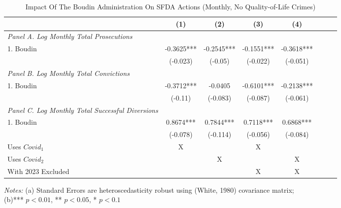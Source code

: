 \begin{table}[htbp]
  \centering
  \caption{Impact Of The Boudin Administration On SFDA Actions (Monthly, No Quality-of-Life Crimes)}
  \label{tab:regression_ca_noqol}
  \begin{tabular}{lccccccc}
    \toprule
    & \multirow{1}{*}{(1)} & \multirow{1}{*}{(2)} & \multirow{1}{*}{(3)} & \multirow{1}{*}{(4)} \\
    \midrule
    \textit{Panel A. Log Monthly Total Prosecutions}  &   &   &  &  \\
    1. Boudin  & -0.3625*** & -0.2545*** & -0.1551*** & -0.3618*** \\
     & (-0.023) & (-0.05) & (-0.022) & (-0.051) \\ \addlinespace

    \textit{Panel B. Log Monthly Total Convictions}  &   &   &  &  \\
    1. Boudin  & -0.3712*** & -0.0405 & -0.6101*** & -0.2138*** \\
     & (-0.11) & (-0.083) & (-0.087) & (-0.061) \\ \addlinespace

    \textit{Panel C. Log Monthly Total Successful Diversions}  &   &   &  &  \\
    1. Boudin  & 0.8674*** & 0.7844*** & 0.7118*** & 0.6868*** \\
     & (-0.078) & (-0.114) & (-0.056) & (-0.084) \\ \addlinespace
     Uses $Covid_1$ & X & & X & \\
     Uses $Covid_2$ & & X & & X \\
     With 2023 Excluded & & & X & X \\
    \bottomrule
  \end{tabular}
  
  \begin{flushleft}
    \textit{Notes:} (a) Standard Errors are heteroscedasticity robust using (White, 1980) covariance matrix; \\
    (b)*** $p<0.01$, ** $p<0.05$, * $p<0.1$
  \end{flushleft}
\end{table}